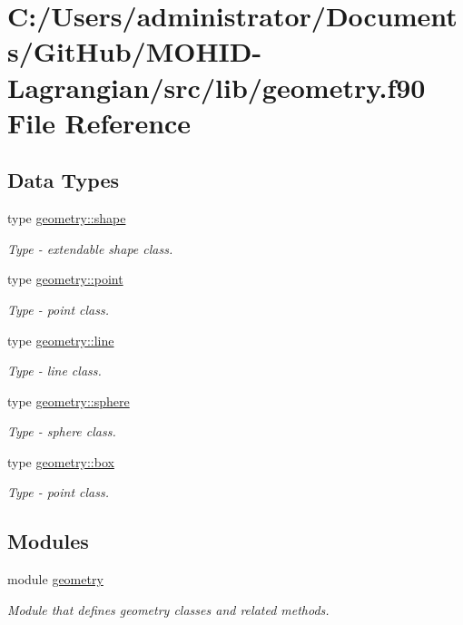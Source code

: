 \hypertarget{geometry_8f90}{}\section{C\+:/\+Users/administrator/\+Documents/\+Git\+Hub/\+M\+O\+H\+I\+D-\/\+Lagrangian/src/lib/geometry.f90 File Reference}
\label{geometry_8f90}
\subsection*{Data Types}
\begin{DoxyCompactItemize}
\item 
type \mbox{\hyperlink{structgeometry_1_1shape}{geometry\+::shape}}
\begin{DoxyCompactList}\small\item\em Type -\/ extendable shape class. \end{DoxyCompactList}\item 
type \mbox{\hyperlink{structgeometry_1_1point}{geometry\+::point}}
\begin{DoxyCompactList}\small\item\em Type -\/ point class. \end{DoxyCompactList}\item 
type \mbox{\hyperlink{structgeometry_1_1line}{geometry\+::line}}
\begin{DoxyCompactList}\small\item\em Type -\/ line class. \end{DoxyCompactList}\item 
type \mbox{\hyperlink{structgeometry_1_1sphere}{geometry\+::sphere}}
\begin{DoxyCompactList}\small\item\em Type -\/ sphere class. \end{DoxyCompactList}\item 
type \mbox{\hyperlink{structgeometry_1_1box}{geometry\+::box}}
\begin{DoxyCompactList}\small\item\em Type -\/ point class. \end{DoxyCompactList}\end{DoxyCompactItemize}
\subsection*{Modules}
\begin{DoxyCompactItemize}
\item 
module \mbox{\hyperlink{namespacegeometry}{geometry}}
\begin{DoxyCompactList}\small\item\em Module that defines geometry classes and related methods. \end{DoxyCompactList}\end{DoxyCompactItemize}
